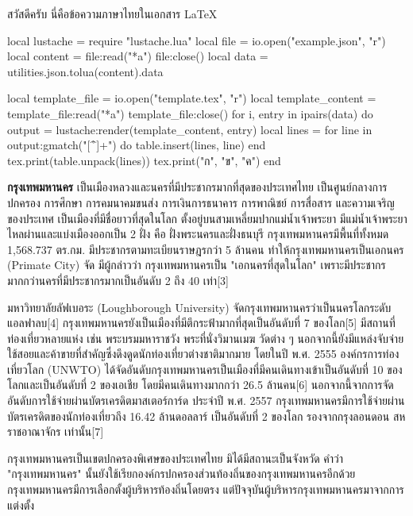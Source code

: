 \documentclass{article}
\begin{document}
สวัสดีครับ นี่คือข้อความภาษาไทยในเอกสาร LaTeX


\begin{luacode*}
local lustache = require "lustache.lua"
local file = io.open("example.json", "r")
local content = file:read("*a")
file:close()
local data = utilities.json.tolua(content).data

local template_file = io.open("template.tex", "r")
local template_content = template_file:read("*a")
template_file:close()
for i, entry in ipairs(data) do
  output = lustache:render(template_content, entry)
  local lines = {}
  for line in output:gmatch("[^\r\n]+") do
    table.insert(lines, line)
  end
  tex.print(table.unpack(lines))
  tex.print("ก", "ข", "ค")
end
\end{luacode*}

\textbf{กรุงเทพมหานคร} เป็นเมืองหลวงและนครที่มีประชากรมากที่สุดของประเทศไทย เป็นศูนย์กลางการปกครอง การศึกษา การคมนาคมขนส่ง การเงินการธนาคาร การพาณิชย์ การสื่อสาร และความเจริญของประเทศ เป็นเมืองที่มีชื่อยาวที่สุดในโลก ตั้งอยู่บนสามเหลี่ยมปากแม่น้ำเจ้าพระยา มีแม่น้ำเจ้าพระยาไหลผ่านและแบ่งเมืองออกเป็น 2 ฝั่ง คือ ฝั่งพระนครและฝั่งธนบุรี กรุงเทพมหานครมีพื้นที่ทั้งหมด 1,568.737 ตร.กม. มีประชากรตามทะเบียนราษฎรกว่า 5 ล้านคน ทำให้กรุงเทพมหานครเป็นเอกนคร (Primate City) จัด มีผู้กล่าวว่า กรุงเทพมหานครเป็น "เอกนครที่สุดในโลก" เพราะมีประชากรมากกว่านครที่มีประชากรมากเป็นอันดับ 2 ถึง 40 เท่า[3]

มหาวิทยาลัยลัฟเบอระ (Loughborough University) จัดกรุงเทพมหานครว่าเป็นนครโลกระดับแอลฟาลบ[4] กรุงเทพมหานครยังเป็นเมืองที่มีตึกระฟ้ามากที่สุดเป็นอันดับที่ 7 ของโลก[5] มีสถานที่ท่องเที่ยวหลายแห่ง เช่น พระบรมมหาราชวัง พระที่นั่งวิมานเมฆ วัดต่าง ๆ นอกจากนี้ยังมีแหล่งจับจ่ายใช้สอยและค้าขายที่สำคัญซึ่งดึงดูดนักท่องเที่ยวต่างชาติมากมาย โดยในปี พ.ศ. 2555 องค์กรการท่องเที่ยวโลก (UNWTO) ได้จัดอันดับกรุงเทพมหานครเป็นเมืองที่มีคนเดินทางเข้าเป็นอันดับที่ 10 ของโลกและเป็นอันดับที่ 2 ของเอเชีย โดยมีคนเดินทางมากกว่า 26.5 ล้านคน[6] นอกจากนี้จากการจัดอันดับการใช้จ่ายผ่านบัตรเครดิตมาสเตอร์การ์ด ประจำปี พ.ศ. 2557 กรุงเทพมหานครมีการใช้จ่ายผ่านบัตรเครดิตของนักท่องเที่ยวถึง 16.42 ล้านดอลลาร์ เป็นอันดับที่ 2 ของโลก รองจากกรุงลอนดอน สหราชอาณาจักร เท่านั้น[7]

กรุงเทพมหานครเป็นเขตปกครองพิเศษของประเทศไทย มิได้มีสถานะเป็นจังหวัด คำว่า "กรุงเทพมหานคร" นั้นยังใช้เรียกองค์กรปกครองส่วนท้องถิ่นของกรุงเทพมหานครอีกด้วย กรุงเทพมหานครมีการเลือกตั้งผู้บริหารท้องถิ่นโดยตรง แต่ปัจจุบันผู้บริหารกรุงเทพมหานครมาจากการแต่งตั้ง
\end{document}

